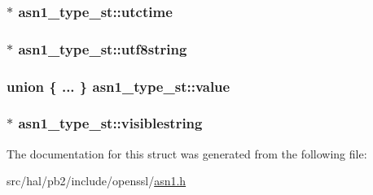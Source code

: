\subsubsection[{\texorpdfstring{utctime}{utctime}}]{$\ast$ asn1\+\_\+type\+\_\+st\+::utctime}\hypertarget{structasn1__type__st_ad4ecd543313b9d6bdf7a47961134ed92}{}\label{structasn1__type__st_ad4ecd543313b9d6bdf7a47961134ed92}
\subsubsection[{\texorpdfstring{utf8string}{utf8string}}]{$\ast$ asn1\+\_\+type\+\_\+st\+::utf8string}\hypertarget{structasn1__type__st_a4a010416f9eb1a60be1276e9382ebed4}{}\label{structasn1__type__st_a4a010416f9eb1a60be1276e9382ebed4}
\subsubsection[{\texorpdfstring{value}{value}}]{\setlength{\rightskip}{0pt plus 5cm}union \{ ... \}   asn1\+\_\+type\+\_\+st\+::value}\hypertarget{structasn1__type__st_a88436e635023ab34575951555202d660}{}\label{structasn1__type__st_a88436e635023ab34575951555202d660}
\subsubsection[{\texorpdfstring{visiblestring}{visiblestring}}]{$\ast$ asn1\+\_\+type\+\_\+st\+::visiblestring}\hypertarget{structasn1__type__st_a6bdc0a3b9d3f3e994853642ae1236822}{}\label{structasn1__type__st_a6bdc0a3b9d3f3e994853642ae1236822}


The documentation for this struct was generated from the following file\+:\begin{DoxyCompactItemize}
\item 
src/hal/pb2/include/openssl/\hyperlink{asn1_8h}{asn1.\+h}\end{DoxyCompactItemize}

